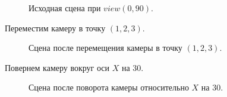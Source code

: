 \documentclass[a5paper, 10pt]{article}
\theoremstyle{definition}
\theoremstyle{plain}
\theoremstyle{remark}
\begin{document}
\begin{figure}[h!]
\caption{Исходная сцена при $view(0, 90)$.}
\end{figure}
Переместим камеру в точку $(1, 2, 3)$.
\begin{figure}[h!]
\caption{Сцена после перемещения камеры в точку $(1, 2, 3)$.}
\end{figure}

Повернем камеру вокруг оси $X$ на $30$\textdegree.

\begin{figure}[h!]
\caption{Сцена после поворота камеры относительно  $X$ на $30$\textdegree.}
\end{figure}
\end{document}
